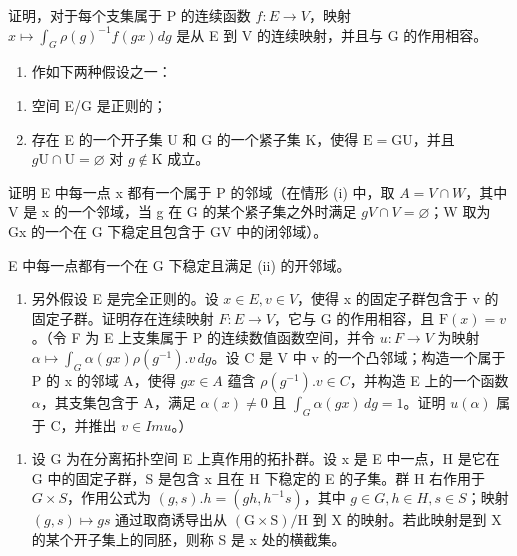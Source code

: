 证明，对于每个支集属于 P 的连续函数 \(f: E \to V\)，映射 \(x \mapsto \int_{G} \rho(g)^{-1} f(gx) dg\) 是从 E 到 V 的连续映射，并且与 G 的作用相容。

\begin{enumerate}
\def\labelenumi{\alph{enumi})}
\setcounter{enumi}{1}
\tightlist
\item
  作如下两种假设之一：
\end{enumerate}

\begin{enumerate}
\def\labelenumi{(\roman{enumi})}
\item
  空间 E/G 是正则的；
\item
  存在 E 的一个开子集 U 和 G 的一个紧子集 K，使得 \(\mathrm{E} = \mathrm{GU}\)，并且 \(g\mathrm{U}\cap \mathrm{U} = \varnothing\) 对 \(g\notin \mathrm{K}\) 成立。
\end{enumerate}

证明 E 中每一点 x 都有一个属于 P 的邻域（在情形 (i) 中，取 \(A = V \cap W\)，其中 V 是 x 的一个邻域，当 g 在 G 的某个紧子集之外时满足 \(gV \cap V = \varnothing\)；W 取为 Gx 的一个在 G 下稳定且包含于 GV 中的闭邻域）。

E 中每一点都有一个在 G 下稳定且满足 (ii) 的开邻域。

\begin{enumerate}
\def\labelenumi{\alph{enumi})}
\setcounter{enumi}{2}
\tightlist
\item
  另外假设 E 是完全正则的。设 \(x \in E, v \in V\)，使得 x 的固定子群包含于 v 的固定子群。证明存在连续映射 \(F : E \to V\)，它与 G 的作用相容，且 \(\mathrm{F}(x) = v\)。（令 F 为 E 上支集属于 P 的连续数值函数空间，并令 \(u : F \to V\) 为映射 \(\alpha \mapsto \int_{G} \alpha(gx) \rho(g^{-1}). v \, dg\)。设 C 是 V 中 v 的一个凸邻域；构造一个属于 P 的 x 的邻域 A，使得 \(gx \in A\) 蕴含 \(\rho(g^{-1}). v \in C\)，并构造 E 上的一个函数 \(\alpha\)，其支集包含于 A，满足 \(\alpha(x) \neq 0\) 且 \(\int_{G} \alpha(gx) \, dg = 1\)。证明 \(u(\alpha)\) 属于 C，并推出 \(v \in Im u\)。）
\end{enumerate}

\begin{enumerate}
\def\labelenumi{\arabic{enumi})}
\setcounter{enumi}{15}
\tightlist
\item
  设 G 为在分离拓扑空间 E 上真作用的拓扑群。设 x 是 E 中一点，H 是它在 G 中的固定子群，S 是包含 x 且在 H 下稳定的 E 的子集。群 H 右作用于 \(G \times S\)，作用公式为 \((g, s).h = (gh, h^{-1}s)\)，其中 \(g \in G, h \in H, s \in S\)；映射 \((g, s) \mapsto gs\) 通过取商诱导出从 \((\mathrm{G} \times \mathrm{S})/\mathrm{H}\) 到 X 的映射。若此映射是到 X 的某个开子集上的同胚，则称 S 是 x 处的横截集。
\end{enumerate}

